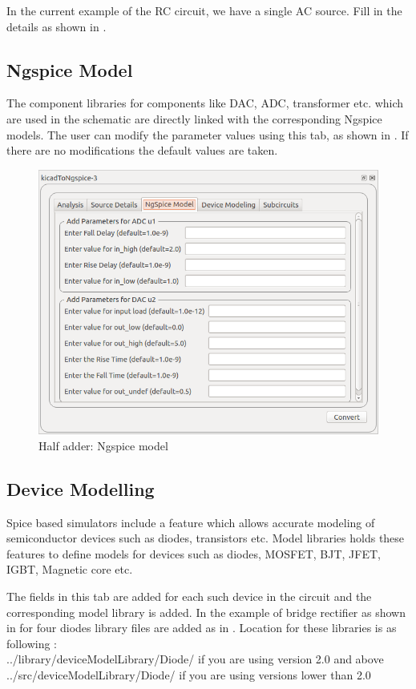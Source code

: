In the current example of the RC circuit, we have a single AC source. Fill in the details as shown in .

\subsection {Ngspice Model} \label{ngspicemodel}
The component libraries for components like DAC, ADC, transformer etc. which are used in the schematic are directly linked with the corresponding Ngspice models. The user can modify the parameter values using this tab, as shown in . If there are no modifications the default values are taken.

\begin{figure}
\centering
\includegraphics[width=\lgfig]{manual_images/ngspice-model.png}
\caption{Half adder: Ngspice model}
\label{ngspicemodel}
\end{figure}

\subsection {Device Modelling} \label{devicemodel}
Spice based simulators include a feature which allows accurate modeling of semiconductor devices such as diodes, transistors etc. Model libraries holds these features to define models for devices such as diodes, MOSFET, BJT, JFET, IGBT, Magnetic core etc.

The fields in this tab are added for each such device in the circuit and the corresponding model library is added. In the example of bridge rectifier as shown in  for four diodes library files are added as in . Location for these libraries is as following : \\
../library/deviceModelLibrary/Diode/ if you are using version 2.0 and above \\
../src/deviceModelLibrary/Diode/ if you are using versions lower than 2.0

